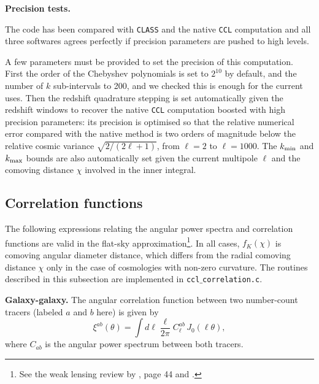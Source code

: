 \documentclass[\docopts]{\docclass}
\newcommand{\ccl}{{\tt CCL}\xspace}
\begin{document}
{\bf Precision tests.}

The code has been compared with \texttt{CLASS} and the native \ccl computation and all three softwares agrees perfectly if precision parameters are pushed to high levels.

A few parameters must be provided to set the precision of this computation. First the order of the Chebyshev polynomials is set to $2^{10}$ by default, and the number of $k$ sub-intervals to 200, and we checked this is enough for the current uses. Then the redshift quadrature stepping is set automatically given the redshift windows to recover the native \ccl computation boosted with high precision parameters: its precision is optimised so that the relative numerical error compared with the native method is two orders of magnitude below the relative cosmic variance $\sqrt{2/(2\ell+1)}$, from $\ell=2$ to $\ell=1000$. The $k_{\rm min}$ and $k_{\rm max}$ bounds are also automatically set given the current multipole $\ell$ and the comoving distance $\chi$ involved in the inner integral.




%
%

\subsection{Correlation functions}
\label{sec:corr}


The following expressions relating the angular power spectra and correlation functions are valid in the flat-sky approximation\footnote{See the weak lensing review by \citet{Bartelmann01}, page 44 and \citet{Joachimi10}.}. In all cases, $f_K(\chi)$ is comoving angular diameter distance, which differs from the radial comoving distance $\chi$ only in the case of cosmologies with non-zero curvature. The routines described in this subsection are implemented in {\tt ccl$\_$correlation.c}.

{\bf Galaxy-galaxy.} The angular correlation function between two number-count tracers (labeled $a$ and $b$ here) is given by
\begin{equation}
  \xi^{ab}(\theta) = \int d\ell \frac{\ell}{2\pi} C^{ab}_\ell\, J_0(\ell\theta),
\label{eq:xiclu}
\end{equation}
where $C_{ab}$ is the angular power spectrum between both tracers.
\end{document}
